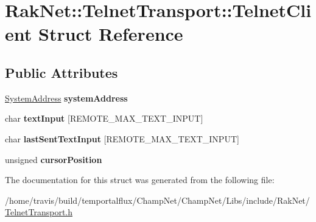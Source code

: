 \hypertarget{struct_rak_net_1_1_telnet_transport_1_1_telnet_client}{\section{Rak\-Net\-:\-:Telnet\-Transport\-:\-:Telnet\-Client Struct Reference}
\label{struct_rak_net_1_1_telnet_transport_1_1_telnet_client}
}
\subsection*{Public Attributes}
\begin{DoxyCompactItemize}
\item 
\hypertarget{struct_rak_net_1_1_telnet_transport_1_1_telnet_client_a41c7563a6b41f74a2dd84c3f87ebc857}{\hyperlink{struct_rak_net_1_1_system_address}{System\-Address} {\bfseries system\-Address}}\label{struct_rak_net_1_1_telnet_transport_1_1_telnet_client_a41c7563a6b41f74a2dd84c3f87ebc857}

\item 
\hypertarget{struct_rak_net_1_1_telnet_transport_1_1_telnet_client_a2b31efb2602f2b6a39de846e0cdeffcb}{char {\bfseries text\-Input} \mbox{[}R\-E\-M\-O\-T\-E\-\_\-\-M\-A\-X\-\_\-\-T\-E\-X\-T\-\_\-\-I\-N\-P\-U\-T\mbox{]}}\label{struct_rak_net_1_1_telnet_transport_1_1_telnet_client_a2b31efb2602f2b6a39de846e0cdeffcb}

\item 
\hypertarget{struct_rak_net_1_1_telnet_transport_1_1_telnet_client_af8c8e0ebce14177cd71040771b513684}{char {\bfseries last\-Sent\-Text\-Input} \mbox{[}R\-E\-M\-O\-T\-E\-\_\-\-M\-A\-X\-\_\-\-T\-E\-X\-T\-\_\-\-I\-N\-P\-U\-T\mbox{]}}\label{struct_rak_net_1_1_telnet_transport_1_1_telnet_client_af8c8e0ebce14177cd71040771b513684}

\item 
\hypertarget{struct_rak_net_1_1_telnet_transport_1_1_telnet_client_a489ac6185165ae95bc17c41be89ce728}{unsigned {\bfseries cursor\-Position}}\label{struct_rak_net_1_1_telnet_transport_1_1_telnet_client_a489ac6185165ae95bc17c41be89ce728}

\end{DoxyCompactItemize}


The documentation for this struct was generated from the following file\-:\begin{DoxyCompactItemize}
\item 
/home/travis/build/temportalflux/\-Champ\-Net/\-Champ\-Net/\-Libs/include/\-Rak\-Net/\hyperlink{_telnet_transport_8h}{Telnet\-Transport.\-h}\end{DoxyCompactItemize}
